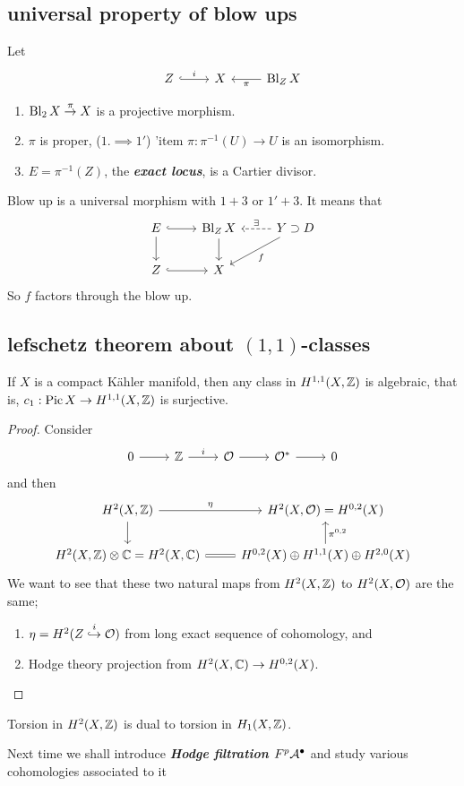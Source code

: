 \subsection{universal property of blow ups}
Let
\[\begin{tikzcd}
	Z\arrow[r,hook,"i"]&X&\Bl_ZX\arrow[l,"\pi"]
\end{tikzcd}\]
\begin{enumerate}
	\item $\operatorname{Bl}_2X\overset{\pi}{\to}X$ is a projective morphism.
	\item[1'.] $\pi$ is proper, ($1.\implies1'$)
	'item $\pi:\pi^{-1}(U)\to U$ is an isomorphism.
	\item $E=\pi^{-1}(Z)$, the \textbf{\textit{exact locus}}, is a Cartier divisor.
\end{enumerate}
\begin{prop}
	Blow up is a universal morphism with $1+3$ or $1'+3$. It means that
	\[\begin{tikzcd}
		E\arrow[r,hook]\arrow[d]&\Bl_ZX\arrow[d]&Y\supset D\arrow[l,dashed,swap,"\exists"]\arrow[dl,"f"]\\
		Z\arrow[r,hook]&X
	\end{tikzcd}\]
	So $f$ factors through the blow up.
\end{prop}

\subsection{lefschetz theorem about $(1,1)$-classes}
\begin{thm}
	If $X$ is a compact Kähler manifold, then any class in $H^{1,1}(X,\mathbb{Z})$ is algebraic, that is, $c_1:\operatorname{Pic} X\to H^{1,1}(X,\mathbb{Z})$ is surjective.
\end{thm}
\begin{proof}
	Consider
	\[\begin{tikzcd}
		0\arrow[r]&\Z\arrow[r,"i"]&\Oc\arrow[r]&\Oc^*\arrow[r]&0
	\end{tikzcd}\]
	and then
	\[\begin{tikzcd}
		H^2(X,\Z)\arrow[r,"\eta"]\arrow[d]&H^2(X,\Oc)=H^{0,2}(X)\\
		H^2(X,\Z)\otimes\C=H^2(X,\C)\arrow[r,equal]&H^{0,2}(X)\oplus H^{1,1}(X)\oplus H^{2,0}(X)\arrow[u,"\pi^{0,2}",swap]
	\end{tikzcd}\]
	We want to see that these two natural maps from $H^2(X,\mathbb{Z})$ to $H^2(X,\mathcal{O})$ are the same;
	\begin{enumerate}
		\item $\eta=H^2(Z\overset{i}{\hookrightarrow}\mathcal{O})$ from long exact sequence of cohomology, and
		\item Hodge theory projection from $H^2(X,\mathbb{C})\to H^{0,2}(X)$.
	\end{enumerate}
\end{proof}
\begin{exercise}
	Torsion in $H^2(X,\mathbb{Z})$ is dual to torsion in $H_1(X,\mathbb{Z})$.
\end{exercise}
\begin{remark}
	Next time we shall introduce \textbf{\textit{Hodge filtration $F^p\mathcal{A}^\bullet$}} and study various cohomologies associated to it
\end{remark}
